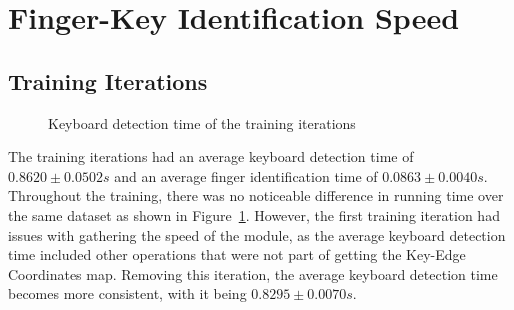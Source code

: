 \documentclass[preprint,12pt,authoryear]{elsarticle}
\begin{document}
\section{Finger-Key Identification Speed}

\subsection{Training Iterations}

\begin{figure}[H]
	\centering
	\caption{Keyboard detection time of the training iterations}
	\label{fig:rd-training-keyboard-detection-time}
\end{figure}

The training iterations had an average keyboard detection time of
$0.8620\pm0.0502s$ and an average finger identification time of
$0.0863\pm0.0040s$. Throughout the training, there was no noticeable difference
in running time over the same dataset as shown in
Figure~\ref{fig:rd-training-keyboard-detection-time}. However, the first
training iteration had issues with gathering the speed of the module, as the
average keyboard detection time included other operations that were not part of
getting the Key-Edge Coordinates map. Removing this iteration, the average
keyboard detection time becomes more consistent, with it being
$0.8295\pm0.0070s$.
\end{document}
